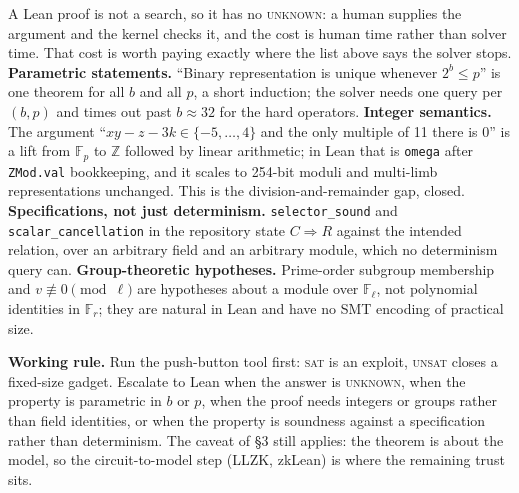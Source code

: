 \documentclass[10pt]{article}
\newcommand{\F}{\mathbb F}\newcommand{\wb}{\overline w}
\newcommand{\sect}[1]{\par\vspace{4pt}{\large\bfseries #1}\par\nobreak\vspace{1pt}}
\begin{document}
\sect{11. When to rely on a Lean proof instead}
A Lean proof is not a search, so it has no \textsc{unknown}: a human supplies the argument and the kernel checks it, and the
cost is human time rather than solver time. That cost is worth paying exactly where the list above says the solver stops.
\textbf{Parametric statements.} ``Binary representation is unique whenever $2^b\le p$'' is one theorem for all $b$ and all $p$,
a short induction; the solver needs one query per $(b,p)$ and times out past $b\approx32$ for the hard operators.
\textbf{Integer semantics.} The argument ``$xy-z-3k\in\{-5,\dots,4\}$ and the only multiple of 11 there is 0'' is a lift from
$\F_p$ to $\mathbb Z$ followed by linear arithmetic; in Lean that is \texttt{omega} after \texttt{ZMod.val} bookkeeping, and it
scales to 254-bit moduli and multi-limb representations unchanged. This is the division-and-remainder gap, closed.
\textbf{Specifications, not just determinism.} \texttt{selector\_sound} and \texttt{scalar\_cancellation} in the repository state
$C\Rightarrow R$ against the intended relation, over an arbitrary field and an arbitrary module, which no determinism query can.
\textbf{Group-theoretic hypotheses.} Prime-order subgroup membership and $v\not\equiv0 \pmod{\ell}$ are hypotheses about a
module over $\F_\ell$, not polynomial identities in $\F_r$; they are natural in Lean and have no SMT encoding of practical size.
\par\smallskip
\textbf{Working rule.} Run the push-button tool first: \textsc{sat} is an exploit, \textsc{unsat} closes a fixed-size gadget.
Escalate to Lean when the answer is \textsc{unknown}, when the property is parametric in $b$ or $p$, when the proof needs
integers or groups rather than field identities, or when the property is soundness against a specification rather than
determinism. The caveat of \S3 still applies: the theorem is about the model, so the circuit-to-model step (LLZK, zkLean) is where
the remaining trust sits.
\end{document}
